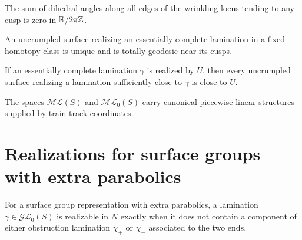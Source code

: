 \begin{proposition}
\label{thurston-ch09-cusp-angle-balance}
 The sum of dihedral angles along all edges of the wrinkling locus tending to any cusp is zero in $\mathbb{R}/2\pi\mathbb{Z}$.
\end{proposition}

\begin{corollary}
\label{thurston-ch09-uncrumpled-uniqueness}
 An uncrumpled surface realizing an essentially complete lamination in a fixed homotopy class is unique and is totally geodesic near its cusps.
\end{corollary}

\begin{proposition}
\label{thurston-ch09-uncrumpled-stability}
 If an essentially complete lamination $\gamma$ is realized by $U$, then every uncrumpled surface realizing a lamination sufficiently close to $\gamma$ is close to $U$.
\end{proposition}

\begin{proposition}
\label{thurston-ch09-ml-pl-structure}
 The spaces $\mathcal{ML}(S)$ and $\mathcal{ML}_0(S)$ carry canonical piecewise-linear structures supplied by train-track coordinates.
\end{proposition}

\section{Realizations for surface groups with extra parabolics}

\begin{proposition}
\label{thurston-ch09-realizability-criterion}
 For a surface group representation with extra parabolics, a lamination $\gamma\in\mathcal{GL}_0(S)$ is realizable in $N$ exactly when it does not contain a component of either obstruction lamination $\chi_+$ or $\chi_-$ associated to the two ends.
\end{proposition}

